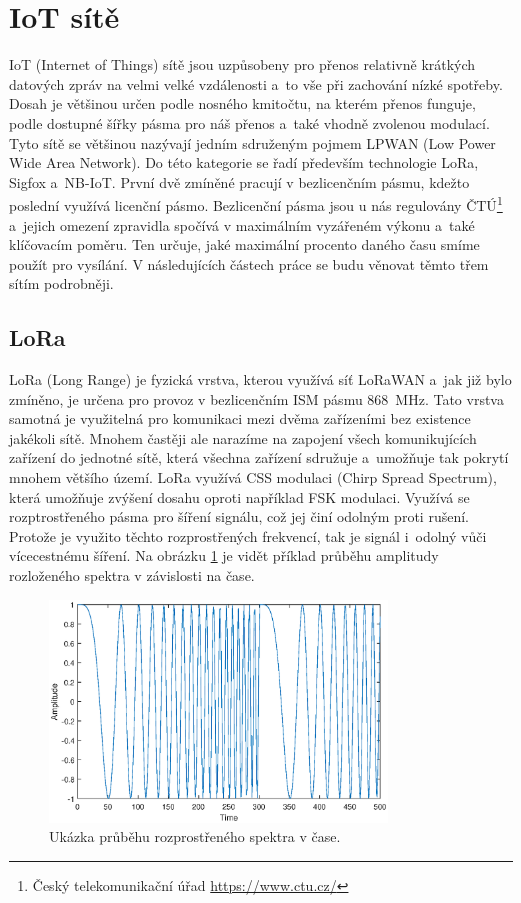\section{IoT sítě}

IoT (Internet of Things) sítě jsou uzpůsobeny pro přenos relativně krátkých datových zpráv na velmi velké vzdálenosti a~to vše při zachování nízké spotřeby. Dosah je většinou určen podle nosného kmitočtu, na kterém přenos funguje, podle dostupné šířky pásma pro náš přenos a~také vhodně zvolenou modulací. Tyto sítě se většinou nazývají jedním sdruženým pojmem LPWAN (Low Power Wide Area Network). Do této kategorie se řadí především technologie LoRa, Sigfox a~NB-IoT. První dvě zmíněné pracují v bezlicenčním pásmu, kdežto poslední využívá licenční pásmo. Bezlicenční pásma jsou u nás regulovány ČTÚ\footnote{Český telekomunikační úřad \url{https://www.ctu.cz/}} a~jejich omezení zpravidla spočívá v maximálním vyzářeném výkonu a~také klíčovacím poměru. Ten určuje, jaké maximální procento daného času smíme použít pro vysílání. V následujících částech práce se budu věnovat těmto třem sítím podrobněji.

\subsection{LoRa}

LoRa (Long Range) je fyzická vrstva, kterou využívá síť LoRaWAN a~jak již bylo zmíněno, je určena pro provoz v bezlicenčním ISM pásmu \SI{868}{\mega\hertz}. Tato vrstva samotná je využitelná pro komunikaci mezi dvěma zařízeními bez existence jakékoli sítě. Mnohem častěji ale narazíme na zapojení všech komunikujících zařízení do jednotné sítě, která všechna zařízení sdružuje a~umožňuje tak pokrytí mnohem většího území. LoRa využívá CSS modulaci (Chirp Spread Spectrum), která umožňuje zvýšení dosahu oproti například FSK modulaci. Využívá se rozptrostřeného pásma pro šíření signálu, což jej činí odolným proti rušení. Protože je využito těchto rozprostřených frekvencí, tak je signál i~odolný vůči vícecestnému šíření. Na obrázku \ref{fig_chirpSpreadSpectrum} je vidět příklad průběhu amplitudy rozloženého spektra v závislosti na čase.

\begin{figure}
    \centering
    \includegraphics[width=0.8\textwidth]{obrazky/ChirpSpreadSpectrum.eps}
    \caption{Ukázka průběhu rozprostřeného spektra v čase.}
    \label{fig_chirpSpreadSpectrum}
\end{figure}

